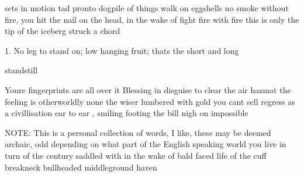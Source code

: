 \begin{center}
\end{center}

sets in motion
tad
pronto
dogpile of things
walk on eggshells
no smoke without fire, you hit the nail on the head, in the wake of
fight fire with fire
this is only the tip of the iceberg
struck a chord

1. No leg to stand on; low hanging fruit; thats the short and long

standstill

Youre fingerprints are all over it
Blessing in disguise
to clear the air
hazmat
the feeling is otherworldly
none the wiser
lumbered with gold you cant sell
regress as a civillisation
ear to ear , smiling
footing the bill
nigh on impossible

NOTE: This is a personal collection of words, I like, these may be deemed archaic, odd depending on what part of the English speaking world you live in
turn of the century
saddled with
in the wake of
bald faced life
of the cuff
breakneck
bullheaded
middleground
haven

